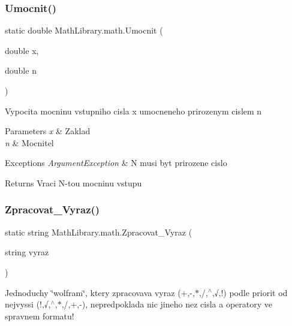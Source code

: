 \subsubsection{\texorpdfstring{Umocnit()}{Umocnit()}}
{\footnotesize\ttfamily static double Math\+Library.\+math.\+Umocnit (\begin{DoxyParamCaption}\item[{double}]{x,  }\item[{double}]{n }\end{DoxyParamCaption})\hspace{0.3cm}{\ttfamily [static]}}



Vypocita mocninu vstupniho cisla x umocneneho prirozenym cislem n 


\begin{DoxyParams}{Parameters}
{\em x} & Zaklad\\
\hline
{\em n} & Mocnitel\\
\hline
\end{DoxyParams}

\begin{DoxyExceptions}{Exceptions}
{\em Argument\+Exception} & N musi byt prirozene cislo\\
\hline
\end{DoxyExceptions}
\begin{DoxyReturn}{Returns}
Vraci N-\/tou mocninu vstupu
\end{DoxyReturn}
\mbox{\label{class_math_library_1_1math_a4f3512b2dcb484d8b579274c5813f706}} 
\subsubsection{\texorpdfstring{Zpracovat\+\_\+\+Vyraz()}{Zpracovat\_Vyraz()}}
{\footnotesize\ttfamily static string Math\+Library.\+math.\+Zpracovat\+\_\+\+Vyraz (\begin{DoxyParamCaption}\item[{string}]{vyraz }\end{DoxyParamCaption})\hspace{0.3cm}{\ttfamily [static]}}



Jednoduchy \char`\"{}wolfram\char`\"{}, ktery zpracovava vyraz (+,-\/,$\ast$,/,$^\wedge$,√,!) podle priorit od nejvyssi (!,√,$^\wedge$,$\ast$,/,+,-\/), nepredpoklada nic jineho nez cisla a operatory ve spravnem formatu! 


